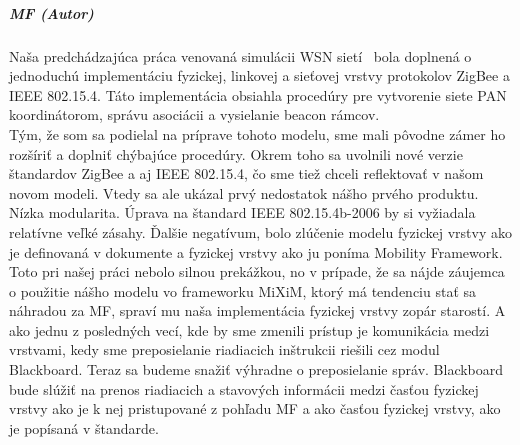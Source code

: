 \subparagraph{MF (Autor)}
\indent Naša predchádzajúca práca venovaná simulácii WSN sietí~\cite{halas03} bola doplnená o jednoduchú implementáciu fyzickej, linkovej a sieťovej vrstvy protokolov ZigBee a IEEE 802.15.4. Táto implementácia obsiahla procedúry pre vytvorenie siete PAN koordinátorom, správu asociácii a vysielanie beacon rámcov.\\
\indent Tým, že som sa podielal na príprave tohoto modelu, sme mali pôvodne zámer ho rozšíriť a doplniť chýbajúce procedúry. Okrem toho  sa uvolnili nové verzie štandardov ZigBee a aj IEEE 802.15.4, čo sme tiež chceli reflektovať v našom novom modeli. Vtedy sa ale ukázal prvý nedostatok nášho prvého produktu. Nízka modularita. Úprava na štandard IEEE 802.15.4b-2006 by si vyžiadala relatívne veľké zásahy. Ďalšie negatívum, bolo zlúčenie modelu fyzickej vrstvy ako je definovaná v dokumente a fyzickej vrstvy ako ju poníma Mobility Framework. Toto pri našej práci nebolo silnou prekážkou, no v prípade, že sa nájde záujemca o použitie nášho modelu vo frameworku MiXiM, ktorý má tendenciu stať sa náhradou za MF, spraví mu naša implementácia fyzickej vrstvy zopár starostí. A ako jednu z posledných vecí, kde by sme zmenili prístup je komunikácia medzi vrstvami, kedy sme preposielanie riadiacich inštrukcii riešili cez modul \ttfamily Blackboard\rmfamily. Teraz sa budeme snažiť výhradne o preposielanie správ. \ttfamily Blackboard \rmfamily bude slúžiť na prenos riadiacich a stavových informácii medzi časťou fyzickej vrstvy ako je k nej pristupované z pohľadu MF a ako časťou fyzickej vrstvy, ako je popísaná v štandarde.

